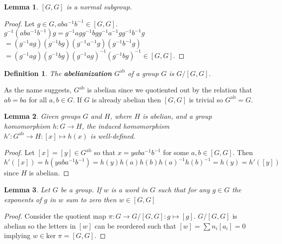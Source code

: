 \documentclass{report}
\newtheorem{definition}{Definition}
\newtheorem{lemma}{Lemma}
\begin{document}
\begin{lemma}
$[G,G]$ is a normal subgroup.
\end{lemma}
\begin{proof}
Let $g\in G,aba^{-1}b^{-1}\in [G,G]$.\\
$g^{-1}(aba^{-1}b^{-1})g=g^{-1}agg^{-1}bgg^{-1}a^{-1}gg^{-1}b^{-1}g$\\
$=(g^{-1}ag)(g^{-1}bg)(g^{-1}a^{-1}g)(g^{-1}b^{-1}g)$\\
$=(g^{-1}ag)(g^{-1}bg)(g^{-1}ag)^{-1}(g^{-1}bg)^{-1}\in[G,G]$.
\end{proof}
\begin{definition}
The \textbf{abelianization} $G^{\text{ab}}$ of a group $G$ is $G/[G,G]$.
\end{definition}
\noindent As the name suggests, $G^{\text{ab}}$ is abelian since we quotiented out by the relation that $ab=ba$ for all $a,b\in G$. If $G$ is already abelian then $[G,G]$ is trivial so $G^{\text{ab}}=G$.

\begin{lemma}
Given groups $G$ and $H$, where $H$ is abelian, and a group homomorphism $h\colon G\to H$, the induced homomorphism $h'\colon G^{\text{ab}}\to H:[x]\mapsto h(x)$ is well-defined.
\end{lemma}
\begin{proof}
Let $[x]=[y]\in G^{\text{ab}}$ so that $x=yaba^{-1}b^{-1}$ for some $a,b\in [G,G]$.
Then $h'([x])=h(yaba^{-1}b^{-1})=h(y)h(a)h(b)h(a)^{-1}h(b)^{-1}=h(y)=h'([y])$ since $H$ is abelian.
\end{proof}

\begin{lemma}
Let $G$ be a group. If $w$ is a word in $G$ such that for any $g\in G$ the exponents of $g$ in $w$ sum to zero then $w\in[G,G]$ 
\end{lemma}
\begin{proof}
Consider the quotient map $\pi\colon G\to G/[G,G]:g\mapsto[g]$.
$G/[G,G]$ is abelian so the letters in $[w]$ can be reordered such that $[w]=\sum n_i[a_i]=0$ implying $w\in\text{ker }\pi=[G,G]$. 
\end{proof}
\end{document}
